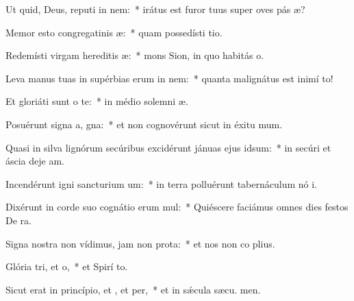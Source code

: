\item Ut quid, Deus, reputi in nem:~* irátus est furor tuus super oves pás æ?
\item Memor esto congregatinis æ:~* quam possedísti  tio.
\item Redemísti virgam hereditis æ:~* mons Sion, in quo habitás  o.
\item Leva manus tuas in supérbias erum in nem:~* quanta malignátus est inimí  to!
\item Et gloriáti sunt  o te:~* in médio solemni æ.
\item Posuérunt signa a, gna:~* et non cognovérunt sicut in éxitu  mum.
\item Quasi in silva lignórum secúribus excidérunt jánuas ejus  idsum:~* in secúri et áscia deje am.
\item Incendérunt igni sancturium um:~* in terra polluérunt tabernáculum nó i.
\item Dixérunt in corde suo cognátio erum mul:~* Quiéscere faciámus omnes dies festos De  ra.
\item Signa nostra non vídimus, jam non  prota:~* et nos non co plius.
\item Glória tri, et o,~* et Spirí to.
\item Sicut erat in princípio, et , et per,~* et in sǽcula sæcu. men.
